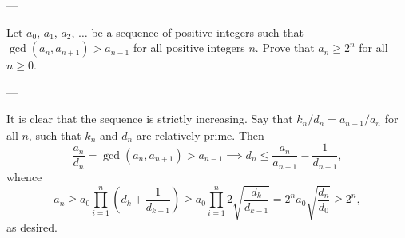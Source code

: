 
---

Let $a_0$, $a_1$, $a_2$, $\ldots$ be a sequence of positive integers such that $\gcd(a_n,a_{n+1})>a_{n-1}$ for all positive integers $n$. Prove that $a_n\ge2^n$ for all $n\ge0$.

---

It is clear that the sequence is strictly increasing. Say that $k_n/d_n=a_{n+1}/a_n$ for all $n$, such that $k_n$ and $d_n$ are relatively prime. Then \[\frac{a_n}{d_n}=\gcd(a_n,a_{n+1})>a_{n-1}\implies d_n\le\frac{a_n}{a_{n-1}}-\frac1{d_{n-1}},\]
whence \[a_n\ge a_0\prod_{i=1}^n\left(d_k+\frac1{d_{k-1}}\right)\ge a_0\prod_{i=1}^n2\sqrt{\frac{d_k}{d_{k-1}}}=2^na_0\sqrt{\frac{d_n}{d_0}}\ge2^n,\]
as desired.

